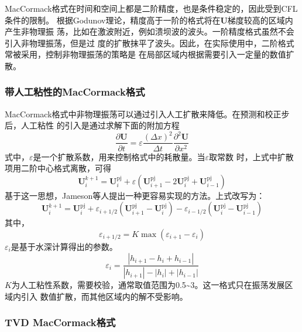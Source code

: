 MacCormack格式在时间和空间上都是二阶精度，也是条件稳定的，因此受到CFL条件的限制。
根据Godunov理论，精度高于一阶的格式将在$\mathbf{U}$梯度较高的区域内产生非物理振
荡，比如在激波附近，例如溃坝波的波头。一阶精度格式虽然不会引入非物理振荡，但是过
度的扩散抹平了波头。因此，在实际使用中，二阶格式常被采用，控制非物理振荡的策略是
在局部区域内根据需要引入一定量的数值扩散。

\subsubsection{带人工粘性的MacCormack格式}
MacCormack格式中非物理振荡可以通过引入人工扩散来降低。在预测和校正步后，人工粘性
的引入是通过求解下面的附加方程
\begin{equation}
  \frac{\partial \mathbf{U}}{\partial t} =
  \varepsilon
  \frac{(\Delta x)^{2}}{\Delta t}
  \frac{{\partial}^{2}\mathbf{U}}{\partial x^{2}}
\end{equation}
式中，$\varepsilon$是一个扩散系数，用来控制格式中的耗散量。当$\varepsilon$取常数
时，上式中扩散项用二阶中心格式离散，可得
\begin{equation}
  \mathbf{U}_{i}^{k+1} =
  \mathbf{U}_{i}^{\mathrm{pj}} +
  \varepsilon
  (
  \mathbf{U}_{i+1}^{\mathrm{pj}} - 
  2\mathbf{U}_{i}^{\mathrm{pj}} +
  \mathbf{U}_{i-1}^{\mathrm{pj}}
  )
\end{equation}
基于这一思想，Jameson等人提出一种更容易实现的方法。上式改写为：
\begin{equation}
  \mathbf{U}_{i}^{k+1} =
  \mathbf{U}_{i}^{\mathrm{pj}} +
  {\varepsilon}_{i+1/2}
  (
  \mathbf{U}_{i+1}^{\mathrm{pj}} - 
  \mathbf{U}_{i}^{\mathrm{pj}}
  )
  -
  {\varepsilon}_{i-1/2}
  (
  \mathbf{U}_{i}^{\mathrm{pj}} -
  \mathbf{U}_{i-1}^{\mathrm{pj}}
  )
\end{equation}
其中，
\begin{equation}
  {\varepsilon}_{i+1/2} =
  K\max({\varepsilon}_{i+1}-{\varepsilon}_{i})
\end{equation}
${\varepsilon}_{i}$是基于水深计算得出的参数。
\begin{equation}
  {\varepsilon}_{i} =
  \frac{|h_{i+1}-h_{i}+h_{i-1}|}{|h_{i+1}|-|h_{i}|+|h_{i-1}|}
\end{equation}
$K$为人工粘性系数，需要校验，通常取值范围为0.5\textasciitilde 3。这一格式只在振荡发展区域内引入
数值扩散，而其他区域内的解不受影响。

\subsubsection{TVD MacCormack格式}

